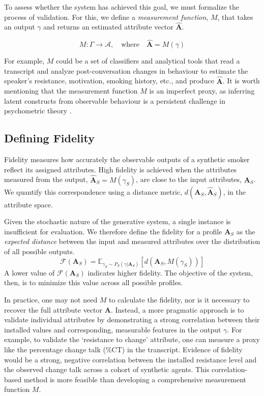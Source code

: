 To assess whether the system has achieved this goal, we must formalize the process of validation. For this, we define a \emph{measurement function}, $M$, that takes an output $\gamma$ and returns an estimated attribute vector $\hat{\textbf{A}}$.

$$M: \Gamma \rightarrow \mathcal{A}, \quad \text{where} \quad \hat{\textbf{A}} = M(\gamma)$$

For example, $M$ could be a set of classifiers and analytical tools that read a transcript and analyze post-conversation changes in behaviour to estimate the speaker's resistance, motivation, smoking history, etc., and produce  $\hat{\textbf{A}}$. It is worth mentioning that the measurement function $M$ is an imperfect proxy, as inferring latent constructs from observable behaviour is a persistent challenge in psychometric theory \cite{loevinger1957objective, borsboom2004concept}.

\subsection{Defining Fidelity}

Fidelity measures how accurately the observable outputs of a synthetic smoker reflect its assigned attributes. High fidelity is achieved when the attributes measured from the output, $\hat{\textbf{A}}_S = M(\gamma_S)$, are close to the input attributes, $\textbf{A}_S$. We quantify this correspondence using a distance metric, $d(\textbf{A}_S, \hat{\textbf{A}}_S)$, in the attribute space.

Given the stochastic nature of the generative system, a single instance is insufficient for evaluation. We therefore define the fidelity for a profile $\textbf{A}_S$ as the \emph{expected distance} between the input and measured attributes over the distribution of all possible outputs.
$$\mathcal{F}(\textbf{A}_S) = \mathbb{E}_{\gamma_S \sim P_S(\gamma | \textbf{A}_S)}[d(\textbf{A}_S, M(\gamma_S))]$$
A lower value of $\mathcal{F}(\textbf{A}_S)$ indicates higher fidelity. The objective of the system, then, is to minimize this value across all possible profiles.

In practice, one may not need $M$ to calculate the fidelity, nor is it necessary to recover the full attribute vector $\textbf{A}$. Instead, a more pragmatic approach is to validate individual attributes by demonstrating a strong correlation between their installed values and corresponding, measurable features in the output $\gamma$. For example, to validate the `resistance to change' attribute, one can measure a proxy like the percentage change talk (\%CT) in the transcript. Evidence of fidelity would be a strong, negative correlation between the installed resistance level and the observed change talk across a cohort of synthetic agents. This correlation-based method is more feasible than developing a comprehensive measurement function $M$.

